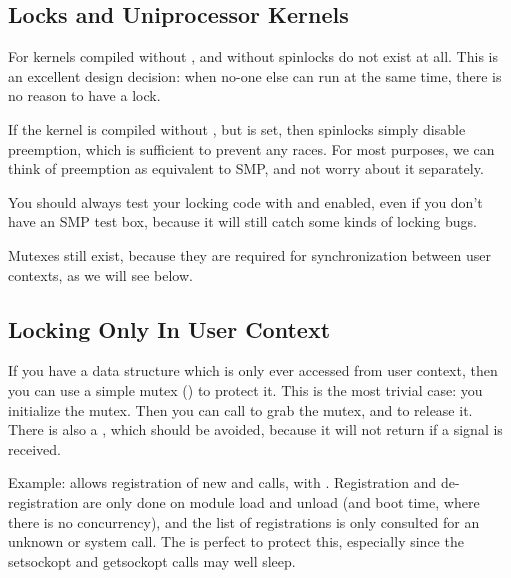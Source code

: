 \documentclass[a4paper,8pt,english]{sphinxmanual}
\begin{document}
\subsection{Locks and Uniprocessor Kernels}
\label{kernel-hacking/locking:locks-and-uniprocessor-kernels}
For kernels compiled without , and without
 spinlocks do not exist at all. This is an excellent
design decision: when no-one else can run at the same time, there is no
reason to have a lock.

If the kernel is compiled without , but 
is set, then spinlocks simply disable preemption, which is sufficient to
prevent any races. For most purposes, we can think of preemption as
equivalent to SMP, and not worry about it separately.

You should always test your locking code with  and
 enabled, even if you don't have an SMP test box,
because it will still catch some kinds of locking bugs.

Mutexes still exist, because they are required for synchronization
between user contexts, as we will see below.


\subsection{Locking Only In User Context}
\label{kernel-hacking/locking:locking-only-in-user-context}
If you have a data structure which is only ever accessed from user
context, then you can use a simple mutex () to
protect it. This is the most trivial case: you initialize the mutex.
Then you can call {\hyperref[kernel\string-hacking/locking:c.mutex_lock_interruptible]{\emph{}}} to grab the
mutex, and {\hyperref[kernel\string-hacking/locking:c.mutex_unlock]{\emph{}}} to release it. There is also a
{\hyperref[kernel\string-hacking/locking:c.mutex_lock]{\emph{}}}, which should be avoided, because it will
not return if a signal is received.

Example:  allows registration of new
 and  calls, with
. Registration and de-registration
are only done on module load and unload (and boot time, where there is
no concurrency), and the list of registrations is only consulted for an
unknown  or  system
call. The  is perfect to protect this, especially
since the setsockopt and getsockopt calls may well sleep.
\end{document}
